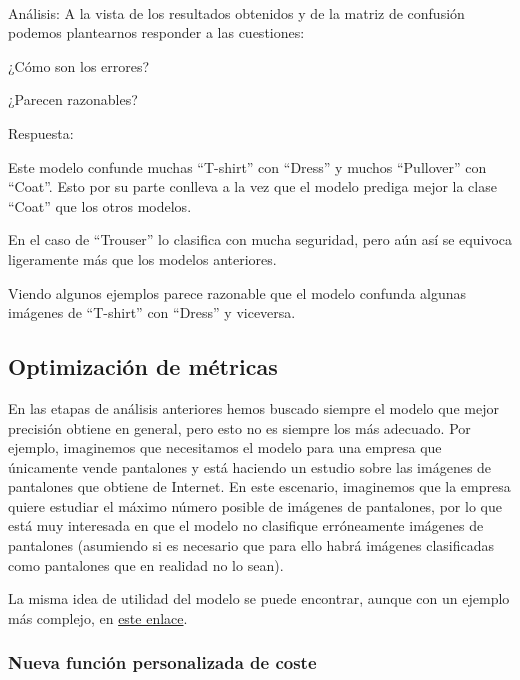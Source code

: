 \documentclass[11pt]{article}
\begin{document}
    \begin{center}
    \end{center}
    { \hspace*{\fill} \\}
    
    Análisis: A la vista de los resultados obtenidos y de la matriz de
confusión podemos plantearnos responder a las cuestiones:

¿Cómo son los errores?

¿Parecen razonables?

    Respuesta:

Este modelo confunde muchas ``T-shirt'' con ``Dress'' y muchos
``Pullover'' con ``Coat''. Esto por su parte conlleva a la vez que el
modelo prediga mejor la clase ``Coat'' que los otros modelos.

En el caso de ``Trouser'' lo clasifica con mucha seguridad, pero aún así
se equivoca ligeramente más que los modelos anteriores.

Viendo algunos ejemplos parece razonable que el modelo confunda algunas
imágenes de ``T-shirt'' con ``Dress'' y viceversa.\\

    \hypertarget{optimizaciuxf3n-de-muxe9tricas}{%
\subsection{Optimización de
métricas}\label{optimizaciuxf3n-de-muxe9tricas}}

En las etapas de análisis anteriores hemos buscado siempre el modelo que
mejor precisión obtiene en general, pero esto no es siempre los más
adecuado. Por ejemplo, imaginemos que necesitamos el modelo para una
empresa que únicamente vende pantalones y está haciendo un estudio sobre
las imágenes de pantalones que obtiene de Internet. En este escenario,
imaginemos que la empresa quiere estudiar el máximo número posible de
imágenes de pantalones, por lo que está muy interesada en que el modelo
no clasifique erróneamente imágenes de pantalones (asumiendo si es
necesario que para ello habrá imágenes clasificadas como pantalones que
en realidad no lo sean).

La misma idea de utilidad del modelo se puede encontrar, aunque con un
ejemplo más complejo, en
\href{http://blog.mldb.ai/blog/posts/2016/01/ml-meets-economics/}{este
enlace}.

    \hypertarget{nueva-funciuxf3n-personalizada-de-coste}{%
\subsubsection{Nueva función personalizada de
coste}\label{nueva-funciuxf3n-personalizada-de-coste}}
\end{document}
